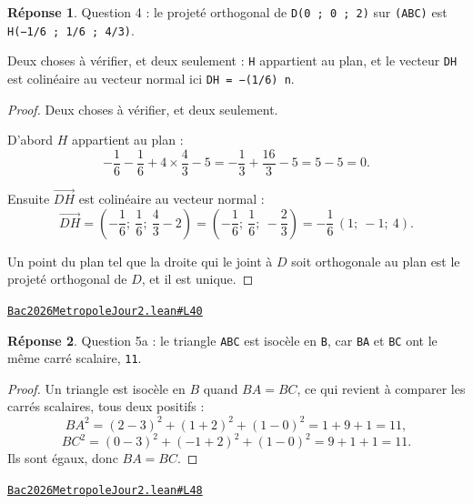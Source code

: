 \documentclass[11pt,a4paper]{article}
\theoremstyle{definition}
\theoremstyle{plain}
\theoremstyle{definition}
\newtheorem*{reponse}{Réponse}
\newcommand{\source}[2]{\par\smallskip\noindent\hfill{\footnotesize\href{#1}{\texttt{#2}}}\par\smallskip}
\begin{document}
\begin{reponse}
Question 4 : le projeté orthogonal de \texttt{D(0 ; 0 ; 2)} sur \texttt{(ABC)} est
\texttt{H(−1/6 ; 1/6 ; 4/3)}.

Deux choses à vérifier, et deux seulement : \texttt{H} appartient au plan, et le vecteur \texttt{DH}
est colinéaire au vecteur normal \textemdash{} ici \texttt{DH = −(1/6) n}.
\end{reponse}
\begin{proof}
Deux choses à vérifier, et deux seulement.

D'abord $H$ appartient au plan :
\[ -\frac{1}{6} - \frac{1}{6} + 4 \times \frac{4}{3} - 5
   = -\frac{1}{3} + \frac{16}{3} - 5 = 5 - 5 = 0 . \]

Ensuite $\vec{DH}$ est colinéaire au vecteur normal :
\[ \vec{DH} = \left(-\frac{1}{6} ;\ \frac{1}{6} ;\ \frac{4}{3} - 2\right)
   = \left(-\frac{1}{6} ;\ \frac{1}{6} ;\ -\frac{2}{3}\right)
   = -\frac{1}{6}\,(1 ;\ -1 ;\ 4) . \]

Un point du plan tel que la droite qui le joint à $D$ soit orthogonale au plan est le
projeté orthogonal de $D$, et il est unique.
\end{proof}
\source{https://github.com/Commutator-IO/learn-lean/blob/main/exams/2026/Bac2026MetropoleJour2.lean\#L40}{Bac2026MetropoleJour2.lean\#L40}

\begin{reponse}
Question 5a : le triangle \texttt{ABC} est isocèle en \texttt{B}, car \texttt{BA} et \texttt{BC} ont le même
carré scalaire, \texttt{11}.
\end{reponse}
\begin{proof}
Un triangle est isocèle en $B$ quand $BA = BC$, ce qui revient à comparer les carrés
scalaires, tous deux positifs :
\[ BA^2 = (2-3)^2 + (1+2)^2 + (1-0)^2 = 1 + 9 + 1 = 11 , \]
\[ BC^2 = (0-3)^2 + (-1+2)^2 + (1-0)^2 = 9 + 1 + 1 = 11 . \]
Ils sont égaux, donc $BA = BC$.
\end{proof}
\source{https://github.com/Commutator-IO/learn-lean/blob/main/exams/2026/Bac2026MetropoleJour2.lean\#L48}{Bac2026MetropoleJour2.lean\#L48}
\end{document}
